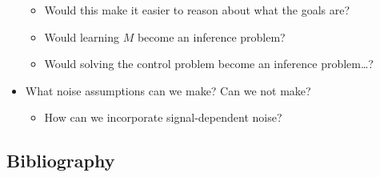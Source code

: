 \documentclass[
  a4paper,
]{article}
\providecommand{\tightlist}{%
  \setlength{\itemsep}{0pt}\setlength{\parskip}{0pt}}
\begin{document}
\begin{itemize}
  \begin{itemize}
  \tightlist
  \item
    Would this make it easier to reason about what the goals are?
  \item
    Would learning \(M\) become an inference problem?
  \item
    Would solving the control problem become an inference problem\ldots?
  \end{itemize}
\item
  What noise assumptions can we make? Can we not make?

  \begin{itemize}
  \tightlist
  \item
    How can we incorporate signal-dependent noise?
  \end{itemize}
\end{itemize}

\newpage

\hypertarget{bibliography}{%
\subsection*{Bibliography}\label{bibliography}}
\end{document}
